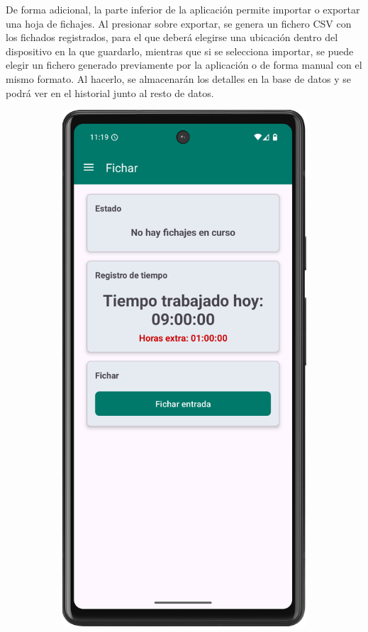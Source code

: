 De forma adicional, la parte inferior de la aplicación permite importar o exportar una hoja de fichajes. Al presionar sobre exportar, se genera un fichero CSV con los fichados registrados, para el que deberá elegirse una ubicación dentro del dispositivo en la que guardarlo, mientras que si se selecciona importar, se puede elegir un fichero generado previamente por la aplicación o de forma manual con el mismo formato. Al hacerlo, se almacenarán los detalles en la base de datos y se podrá ver en el historial junto al resto de datos.

\begin{figure}[H]
     \centering
     \begin{subfigure}[b]{0.22\textwidth}
         \centering
         \includegraphics[width=\textwidth]{root/fichando.png}

\end{subfigure}
\end{figure}
